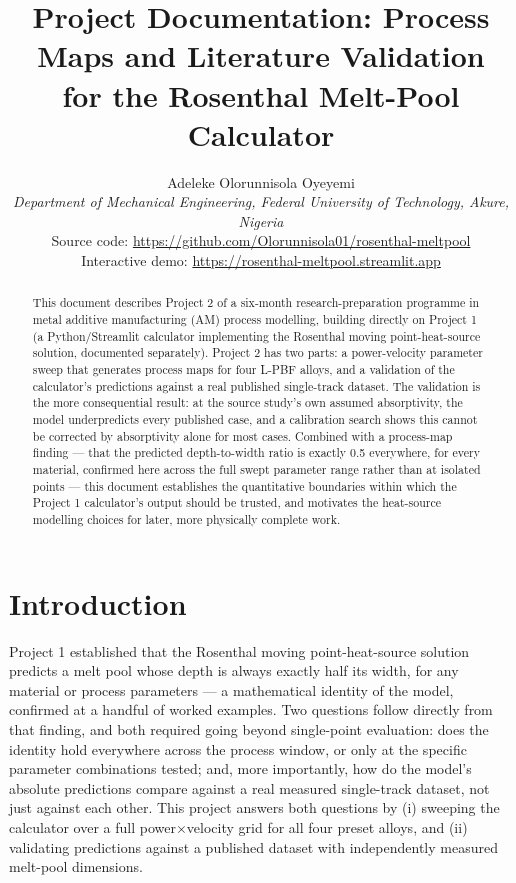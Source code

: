 \documentclass[10pt,journal]{IEEEtran}
\begin{document}
\title{Project Documentation: Process Maps and Literature Validation\\
\large for the Rosenthal Melt-Pool Calculator}

\author{Adeleke Olorunnisola Oyeyemi\\
\textit{Department of Mechanical Engineering, Federal University of Technology, Akure, Nigeria}\\
Source code: \url{https://github.com/Olorunnisola01/rosenthal-meltpool}\\
Interactive demo: \url{https://rosenthal-meltpool.streamlit.app}}


\maketitle

\begin{abstract}
This document describes Project 2 of a six-month research-preparation programme in metal additive manufacturing (AM) process modelling, building directly on Project 1 (a Python/Streamlit calculator implementing the Rosenthal moving point-heat-source solution, documented separately). Project 2 has two parts: a power-velocity parameter sweep that generates process maps for four L-PBF alloys, and a validation of the calculator's predictions against a real published single-track dataset. The validation is the more consequential result: at the source study's own assumed absorptivity, the model underpredicts every published case, and a calibration search shows this cannot be corrected by absorptivity alone for most cases. Combined with a process-map finding --- that the predicted depth-to-width ratio is exactly 0.5 everywhere, for every material, confirmed here across the full swept parameter range rather than at isolated points --- this document establishes the quantitative boundaries within which the Project 1 calculator's output should be trusted, and motivates the heat-source modelling choices for later, more physically complete work.
\end{abstract}

\section{Introduction}

Project 1 established that the Rosenthal moving point-heat-source solution predicts a melt pool whose depth is always exactly half its width, for any material or process parameters --- a mathematical identity of the model, confirmed at a handful of worked examples. Two questions follow directly from that finding, and both required going beyond single-point evaluation: does the identity hold everywhere across the process window, or only at the specific parameter combinations tested; and, more importantly, how do the model's absolute predictions compare against a real measured single-track dataset, not just against each other. This project answers both questions by (i) sweeping the calculator over a full power$\times$velocity grid for all four preset alloys, and (ii) validating predictions against a published dataset with independently measured melt-pool dimensions.
\end{document}
